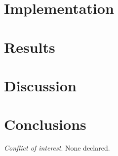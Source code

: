 \documentclass{article}
\begin{document}
\section{Implementation}

\section{Results}

\section{Discussion}


\section{Conclusions}


\textit{Conflict of interest}. None declared.

\newpage



\end{document}
